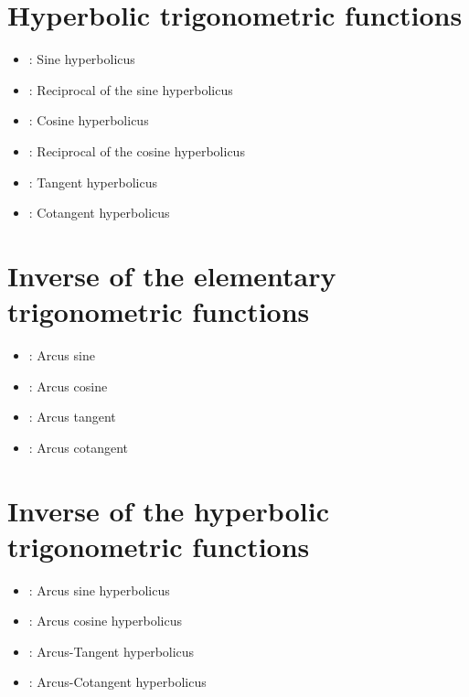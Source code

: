 \section{Hyperbolic trigonometric functions}

\begin{itemize}

\item
{}:
Sine hyperbolicus

\item
{}:
Reciprocal of the sine hyperbolicus

\item
{}:
Cosine hyperbolicus

\item
{}:
Reciprocal of the cosine hyperbolicus

\item
{}:
Tangent hyperbolicus

\item
{}:
Cotangent hyperbolicus

\end{itemize}



\section{Inverse of the elementary trigonometric functions}

\begin{itemize}

\item
{}:
Arcus sine

\item
{}:
Arcus cosine

\item
{}:
Arcus tangent

\item
{}:
Arcus cotangent

\end{itemize}



\section{Inverse of the hyperbolic trigonometric functions}

\begin{itemize}

\item
{}:
Arcus sine hyperbolicus

\item
{}:
Arcus cosine hyperbolicus

\item
{}:
Arcus-Tangent hyperbolicus

\item
{}:
Arcus-Cotangent hyperbolicus

\end{itemize}




